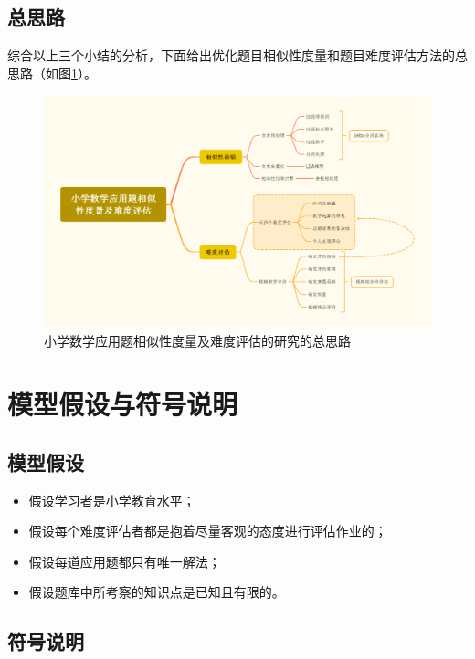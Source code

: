 \subsection{总思路}

综合以上三个小结的分析，下面给出优化题目相似性度量和题目难度评估方法的总思路（如图\ref{figure042108}）。

\begin{figure}[h]
    \centering
    \includegraphics[scale=0.2]{res/figure042108.png}
    \caption{小学数学应用题相似性度量及难度评估的研究的总思路}
    \label{figure042108}
\end{figure}

%
%

\section{模型假设与符号说明}

\subsection{模型假设}

\begin{itemize}
    \item 假设学习者是小学教育水平；
    \item 假设每个难度评估者都是抱着尽量客观的态度进行评估作业的；
    \item 假设每道应用题都只有唯一解法；
    \item 假设题库中所考察的知识点是已知且有限的。
\end{itemize}

\subsection{符号说明}

